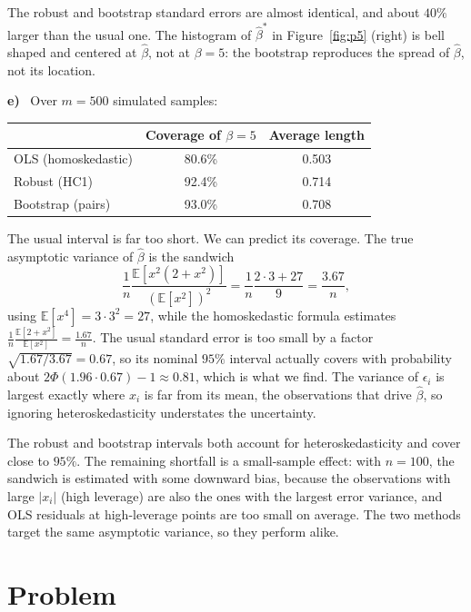 \documentclass[11pt]{article}
\newcommand{\E}{\mathbb{E}}
\theoremstyle{plain}
\newcounter{problem}
\renewcommand{\theproblem}{\arabic{problem}}
\newcommand{\problem}{
	\stepcounter{problem}
	\section*{Problem \theproblem}
}
\newcommand{\itm}[1]{\par\textbf{#1)}\ }
\begin{document}
The robust and bootstrap standard errors are almost identical, and about $40\%$ larger than the usual one. The histogram of $\hat\beta^*$ in Figure~\ref{fig:p5} (right) is bell shaped and centered at $\hat\beta$, not at $\beta=5$: the bootstrap reproduces the spread of $\hat\beta$, not its location.

\itm{e}
Over $m=500$ simulated samples:

\begin{table}[H]
	\centering
	\begin{tabular}{lcc}
		\toprule
		& Coverage of $\beta=5$ & Average length \\
		\midrule
		OLS (homoskedastic) & 80.6\% & 0.503 \\
		Robust (HC1) & 92.4\% & 0.714 \\
		Bootstrap (pairs) & 93.0\% & 0.708 \\
		\bottomrule
	\end{tabular}
\end{table}

The usual interval is far too short. We can predict its coverage. The true asymptotic variance of $\hat\beta$ is the sandwich
\[
\frac1n\frac{\E[x^2(2+x^2)]}{(\E[x^2])^2} = \frac1n\frac{2\cdot 3+27}{9} = \frac{3.67}{n},
\]
using $\E[x^4]=3\cdot 3^2=27$, while the homoskedastic formula estimates $\frac1n\frac{\E[2+x^2]}{\E[x^2]} = \frac{1.67}{n}$. The usual standard error is too small by a factor $\sqrt{1.67/3.67}=0.67$, so its nominal $95\%$ interval actually covers with probability about $2\Phi(1.96\cdot 0.67)-1\approx 0.81$, which is what we find. The variance of $\epsilon_i$ is largest exactly where $x_i$ is far from its mean, the observations that drive $\hat\beta$, so ignoring heteroskedasticity understates the uncertainty.

The robust and bootstrap intervals both account for heteroskedasticity and cover close to $95\%$. The remaining shortfall is a small-sample effect: with $n=100$, the sandwich is estimated with some downward bias, because the observations with large $|x_i|$ (high leverage) are also the ones with the largest error variance, and OLS residuals at high-leverage points are too small on average. The two methods target the same asymptotic variance, so they perform alike.



\problem
\end{document}
